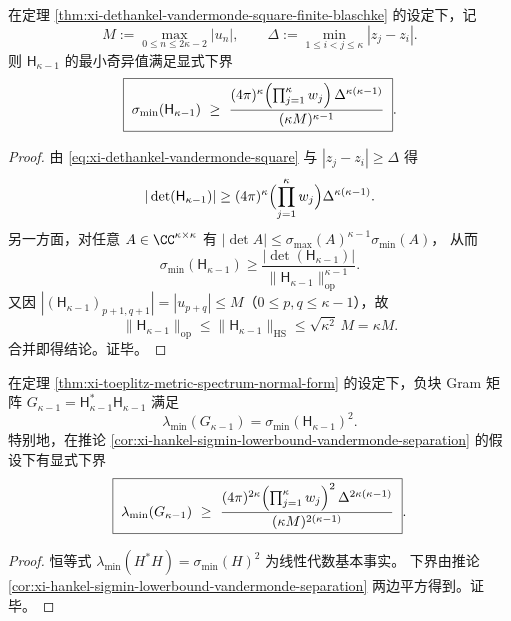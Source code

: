\begin{corollary}\label{cor:xi-hankel-sigmin-lowerbound-vandermonde-separation}
在定理 \ref{thm:xi-dethankel-vandermonde-square-finite-blaschke} 的设定下，记
\[
M:=\max_{0\le n\le 2\kappa-2}|u_n|,
\qquad
\Delta:=\min_{1\le i<j\le \kappa}|z_j-z_i|.
\]
则 \(\mathsf H_{\kappa-1}\) 的最小奇异值满足显式下界
\[
\boxed{\;
\sigma_{\min}(\mathsf H_{\kappa-1})
\ \ge\
\frac{(4\pi)^{\kappa}\Bigl(\prod_{j=1}^{\kappa}w_j\Bigr)\,\Delta^{\kappa(\kappa-1)}}
{(\kappa M)^{\kappa-1}}\; }.
\]
\end{corollary}
\begin{proof}
由 \eqref{eq:xi-dethankel-vandermonde-square} 与 \(|z_j-z_i|\ge \Delta\) 得
\[
|\det(\mathsf H_{\kappa-1})|
\ge
(4\pi)^{\kappa}\Bigl(\prod_{j=1}^{\kappa}w_j\Bigr)\Delta^{\kappa(\kappa-1)}.
\]
另一方面，对任意 \(A\in\CC^{\kappa\times\kappa}\) 有
\(
|\det A|\le \sigma_{\max}(A)^{\kappa-1}\sigma_{\min}(A)
\)，
从而
\[
\sigma_{\min}(\mathsf H_{\kappa-1})
\ge
\frac{|\det(\mathsf H_{\kappa-1})|}{\|\mathsf H_{\kappa-1}\|_{\mathrm{op}}^{\kappa-1}}.
\]
又因 \(|(\mathsf H_{\kappa-1})_{p+1,q+1}|=|u_{p+q}|\le M\)（\(0\le p,q\le \kappa-1\)），故
\[
\|\mathsf H_{\kappa-1}\|_{\mathrm{op}}
\le
\|\mathsf H_{\kappa-1}\|_{\mathrm{HS}}
\le
\sqrt{\kappa^2}\,M=\kappa M.
\]
合并即得结论。证毕。
\end{proof}

\begin{corollary}\label{cor:xi-toeplitz-negative-block-margin-certificate}
在定理 \ref{thm:xi-toeplitz-metric-spectrum-normal-form} 的设定下，负块 Gram 矩阵
\(
G_{\kappa-1}=\mathsf H_{\kappa-1}^{\ast}\mathsf H_{\kappa-1}
\)
满足
\[
\lambda_{\min}(G_{\kappa-1})=\sigma_{\min}(\mathsf H_{\kappa-1})^2.
\]
特别地，在推论 \ref{cor:xi-hankel-sigmin-lowerbound-vandermonde-separation} 的假设下有显式下界
\[
\boxed{\;
\lambda_{\min}(G_{\kappa-1})
\ \ge\
\frac{(4\pi)^{2\kappa}\Bigl(\prod_{j=1}^{\kappa}w_j\Bigr)^2\,\Delta^{2\kappa(\kappa-1)}}
{(\kappa M)^{2(\kappa-1)}}\; }.
\]
\end{corollary}
\begin{proof}
恒等式 \(\lambda_{\min}(H^{\ast}H)=\sigma_{\min}(H)^2\) 为线性代数基本事实。
下界由推论 \ref{cor:xi-hankel-sigmin-lowerbound-vandermonde-separation} 两边平方得到。证毕。
\end{proof}

